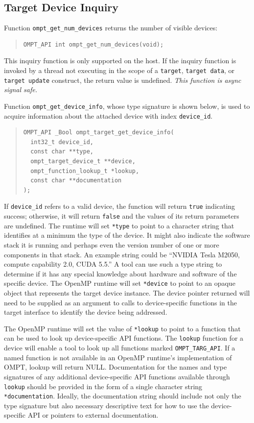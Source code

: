 \documentclass{article}
\begin{document}
\subsection{Target Device Inquiry}
\label{sec:target-device}
Function \verb|ompt_get_num_devices| returns the number of visible devices:
\begin{quote}
\begin{verbatim}
OMPT_API int ompt_get_num_devices(void);
\end{verbatim}
\end{quote}
This inquiry function is only supported on the host. If the inquiry function is invoked by a thread not executing in the scope of a {\tt target}, {\tt target data}, or {\tt target update} construct, the return value is undefined. {\it This function is async signal safe.}

Function \verb|ompt_get_device_info|, whose type signature is shown below, is used to acquire information about the attached device with  index \verb|device_id|. 
\begin{quote}
\begin{verbatim}
OMPT_API _Bool ompt_target_get_device_info(
  int32_t device_id, 
  const char **type, 
  ompt_target_device_t **device,
  ompt_function_lookup_t *lookup,
  const char **documentation
);
\end{verbatim}
\end{quote}
If \verb|device_id| refers to a valid device, the function will return \verb|true| indicating success; otherwise, it will return \verb|false| and the values of its return parameters are undefined. The runtime will set \verb|*type| to point to a character string that identifies at a minimum the  type of the device. It might also indicate the software stack it is running and perhaps even the version number of one or more components in that stack. An example string could be ``NVIDIA Tesla M2050, compute capability 2.0, CUDA 5.5.'' A tool can use such a type string to determine if it has any special knowledge about hardware and software of the specific device. The OpenMP runtime will set \verb|*device| to point to an opaque object that represents the target device instance. The device pointer returned will need to be supplied as an argument to calls to device-specific functions in the target interface to identify the device being addressed.

The OpenMP runtime will set the value of \verb|*lookup| to point to a function that can be used to look up device-specific API functions.  The \verb|lookup| function for a device will enable a tool to look up all functions marked \verb|OMPT_TARG_API|.  If a named function is not available in an OpenMP runtime's implementation of OMPT, lookup will return NULL. Documentation for the names and type signatures of any additional device-specific API functions available through \verb|lookup| should be provided in the form of a single character string \verb|*documentation|. Ideally, the documentation string should include not only the type signature but also necessary descriptive text for how to use the device-specific API or pointers to external documentation.
\end{document}
